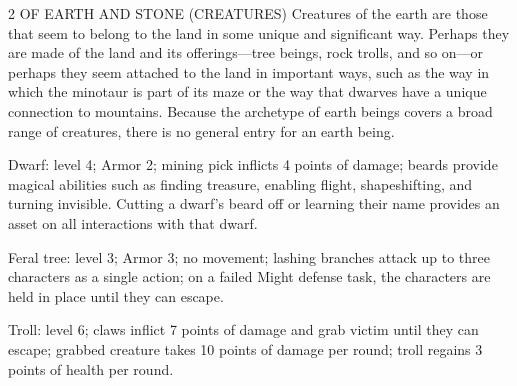 \begin{multicols}{2}
OF EARTH AND STONE (CREATURES)
Creatures of the earth are those that seem to belong to the land in some unique and significant way. Perhaps they are made of the land and its offerings—tree beings, rock trolls, and so on—or perhaps they seem attached to the land in important ways, such as the way in which the minotaur is part of its maze or the way that dwarves have a unique connection to mountains.
Because the archetype of earth beings covers a broad range of creatures, there is no general entry for an earth being.

Dwarf: level 4; Armor 2; mining pick inflicts 4 points of damage; beards provide magical abilities such as finding treasure, enabling flight, shapeshifting, and turning invisible. Cutting a dwarf’s beard off or learning their name provides an asset on all interactions with that dwarf.

Feral tree: level 3; Armor 3; no movement; lashing branches attack up to three characters as a single action; on a failed Might defense task, the characters are held in place until they can escape.

Troll: level 6; claws inflict 7 points of damage and grab victim until they can escape; grabbed creature takes 10 points of damage per round; troll regains 3 points of health per round.


\end{multicols}
